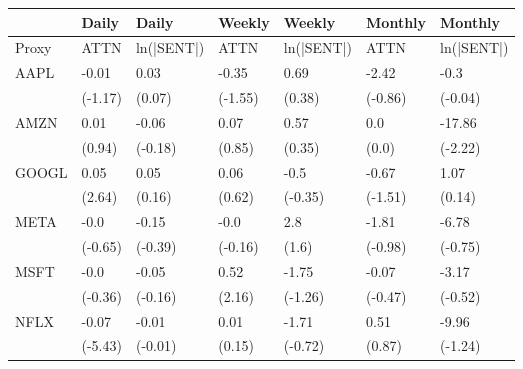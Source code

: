 \begin{tabular}{lllllll}
\toprule
{} &    Daily &       Daily &   Weekly &      Weekly &  Monthly &     Monthly \\
\midrule
Proxy &     ATTN &  ln(|SENT|) &     ATTN &  ln(|SENT|) &     ATTN &  ln(|SENT|) \\
AAPL  &    -0.01 &        0.03 &    -0.35 &        0.69 &    -2.42 &        -0.3 \\
      &  (-1.17) &      (0.07) &  (-1.55) &      (0.38) &  (-0.86) &     (-0.04) \\
AMZN  &     0.01 &       -0.06 &     0.07 &        0.57 &      0.0 &      -17.86 \\
      &   (0.94) &     (-0.18) &   (0.85) &      (0.35) &    (0.0) &     (-2.22) \\
GOOGL &     0.05 &        0.05 &     0.06 &        -0.5 &    -0.67 &        1.07 \\
      &   (2.64) &      (0.16) &   (0.62) &     (-0.35) &  (-1.51) &      (0.14) \\
META  &     -0.0 &       -0.15 &     -0.0 &         2.8 &    -1.81 &       -6.78 \\
      &  (-0.65) &     (-0.39) &  (-0.16) &       (1.6) &  (-0.98) &     (-0.75) \\
MSFT  &     -0.0 &       -0.05 &     0.52 &       -1.75 &    -0.07 &       -3.17 \\
      &  (-0.36) &     (-0.16) &   (2.16) &     (-1.26) &  (-0.47) &     (-0.52) \\
NFLX  &    -0.07 &       -0.01 &     0.01 &       -1.71 &     0.51 &       -9.96 \\
      &  (-5.43) &     (-0.01) &   (0.15) &     (-0.72) &   (0.87) &     (-1.24) \\
\bottomrule
\end{tabular}

